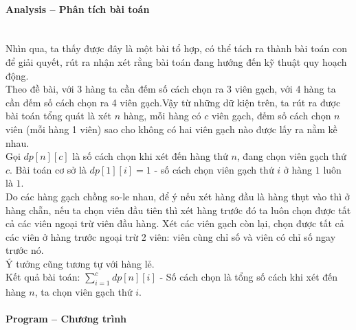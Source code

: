 \documentclass{article}
\begin{document}
\paragraph{Analysis -- Phân tích bài toán} \mbox{} \\

Nhìn qua, ta thấy được đây là một bài tổ hợp, có thể tách ra thành bài toán con để giải quyết, rút ra nhận xét rằng bài toán đang hướng đến kỹ thuật quy hoạch động. \\

Theo đề bài, với 3 hàng ta cần đếm số cách chọn ra 3 viên gạch, với 4 hàng ta cần đếm số cách chọn ra 4 viên gạch.Vậy từ những dữ kiện trên, ta rút ra được bài toán tổng quát là xét $n$ hàng, mỗi hàng có $c$ viên gạch, đếm số cách chọn $n$ viên (mỗi hàng 1 viên) sao cho không có hai viên gạch nào được lấy ra nằm kề nhau. \\

Gọi $dp[n][c]$ là số cách chọn khi xét đến hàng thứ $n$, đang chọn viên gạch thứ $c$. Bài toán cơ sở là $dp[1][i] = 1$ - số cách chọn viên gạch thứ $i$ ở hàng $1$ luôn là $1$.\\

Do các hàng gạch chồng so-le nhau, để ý nếu xét hàng đầu là hàng thụt vào thì ở hàng chẵn, nếu ta chọn viên đầu tiên thì xét hàng trước đó ta luôn chọn được tất cả các viên ngoại trừ viên đầu hàng. Xét các viên gạch còn lại, chọn được tất cả các viên ở hàng trước ngoại trừ 2 viên: viên cùng chỉ số và viên có chỉ số ngay trước nó. \\

Ý tưởng cũng tương tự với hàng lẻ. \\

Kết quả bài toán: $\sum_{i =1}^{c}dp[n][i]$ - Số cách chọn là tổng số cách khi xét đến hàng $n$, ta chọn viên gạch thứ $i$.\\



\paragraph{Program -- Chương trình} \mbox{} \\
\end{document}
